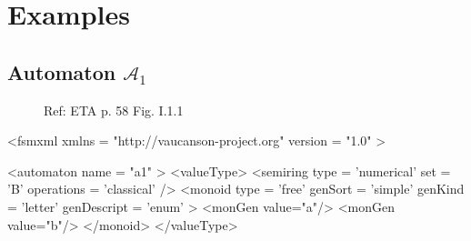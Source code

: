 \section{Examples}

\subsection{Automaton $\mathcal{A}_1$}
\label{automatonA1}

\begin{figure}[h]
  \begin{minipage}[c]{.66\textwidth}
    Ref: ETA p. 58 Fig. I.1.1
  \end{minipage}
  \begin{minipage}[c]{.34\textwidth}

  \end{minipage}
\end{figure}

{\footnotesize 
\begin{listing}[5]{1}
<fsmxml  xmlns   = "http://vaucanson-project.org" 
         version = "1.0" > 

<automaton name = "a1" >
  <valueType>
    <semiring  type        = 'numerical'
               set         = 'B'
               operations  = 'classical' /> 
    <monoid    type        = 'free'
               genSort     = 'simple' 
               genKind     = 'letter' 
               genDescript = 'enum' >
      <monGen value="a"/>
      <monGen value="b"/>
    </monoid>
  </valueType>
\end{listing}
}

\newpage

